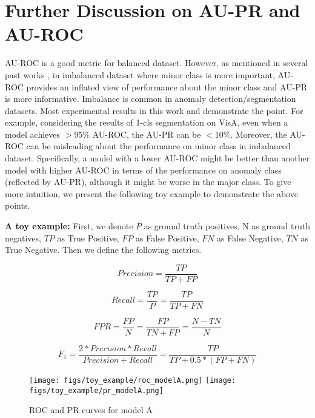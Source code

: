 \documentclass[runningheads]{llncs}
\begin{document}
\section{Further Discussion on AU-PR and AU-ROC}
AU-ROC is a good metric for balanced dataset. However, as mentioned in several past works \cite{cook2020consult,davis2006relationship,saito2015precision}, in imbalanced dataset where minor class is more important, AU-ROC provides an inflated view of performance about the minor class and AU-PR is more informative. Imbalance is common in anomaly detection/segmentation datasets. Most experimental results in this work and \cite{bergmann2021mvtec} demonstrate the point. For example, considering the results of 1-cls segmentation on VisA, even when a model achieves $>95\%$ AU-ROC, the AU-PR can be $<10\%$. Moreover, the AU-ROC can be misleading about the performance on minor class in imbalanced dataset. Specifically, a model with a lower AU-ROC might be better than another model with higher AU-ROC in terms of the performance on anomaly class (reflected by AU-PR), although it might be worse in the major class. To give more intuition, we present the following toy example to demonstrate the above points. 

\noindent\textbf{A toy example: } 
First, we denote $P$ as ground truth positives, N as ground truth negatives, $TP$ as True Positive, $FP$ as False Positive, $FN$ as False Negative, $TN$ as True Negative. Then we define the following metrics.

\begin{equation}
    Precision=\frac{TP}{TP+FP}
    \label{eqn:prec}
\end{equation}

\begin{equation}
    Recall=\frac{TP}{P}=\frac{TP}{TP+FN}
    \label{eqn:recall}
\end{equation}

\begin{equation}
    FPR=\frac{FP}{N}=\frac{FP}{TN+FP}=\frac{N-TN}{N}
    \label{eqn:FPR}
\end{equation}

\begin{equation}
    F_1=\frac{2*Precision*Recall}{Precision+Recall}=\frac{TP}{TP+0.5*(FP+FN)}
    \label{eqn:F1}
\end{equation}

\begin{figure}[!ht]
\centering
\texttt{[image: figs/toy\_example/roc\_modelA.png]}
\texttt{[image: figs/toy\_example/pr\_modelA.png]}\\
 \caption{ROC and PR curves for model A}
 \label{fig:curves_modelA}
\end{figure}
\end{document}
